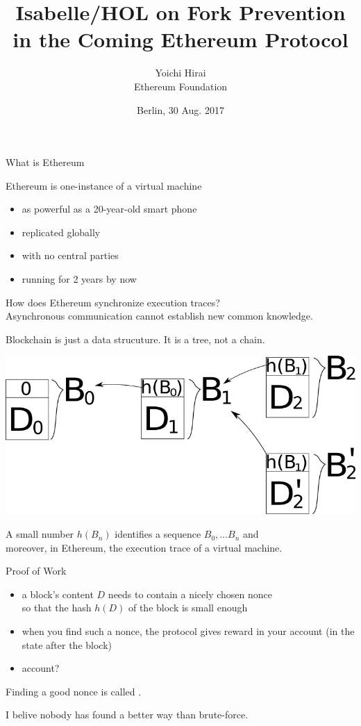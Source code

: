 \documentclass{beamer}
\title{Isabelle/HOL on Fork Prevention\\ in the Coming Ethereum Protocol}
\author{Yoichi Hirai\\ {\small Ethereum Foundation}}
\date{Berlin, 30 Aug. 2017}
\begin{document}
\begin{frame}
\titlepage
\end{frame}

\begin{frame}{What is Ethereum}

Ethereum is one-instance of a virtual machine
\begin{itemize}
\item as powerful as a 20-year-old smart phone
\item replicated globally
\item with no central parties
\item running for 2 years by now
\end{itemize}

\vfill

How does Ethereum synchronize execution traces? \\
Asynchronous communication cannot establish new common knowledge.
\end{frame}

\begin{frame}{Blockchain}
is just a data strucuture.  It is a tree, not a chain.

\includegraphics[width=\textwidth]{blockchains.png}

A small number $h(B_n)$ identifies a sequence $B_0, \ldots B_n$ and \\
moreover, in Ethereum, the execution trace of a virtual machine.

\end{frame}


\begin{frame}{Proof of Work}

\begin{itemize}
\item a block's content $D$ needs to contain a nicely chosen nonce\\ so that the hash $h(D)$ of the block is small enough
\item when you find such a nonce, the protocol gives reward in your account (in the state after the block)
\item account?
\end{itemize}

Finding a good nonce is called .

I belive nobody has found a better way than brute-force.
\end{frame}
\end{document}
